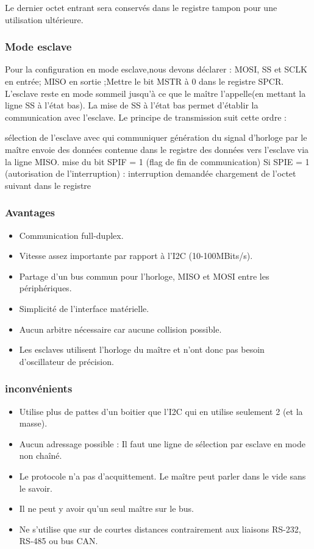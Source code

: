 \documentclass[french,a4paper,12pt]{report}
\begin{document}
Le dernier octet entrant sera conservés dans le registre tampon pour une utilisation ultérieure.

  \subsubsection{Mode esclave}
Pour la configuration en mode esclave,nous devons déclarer : MOSI, SS et SCLK en entrée; MISO en sortie ;Mettre le bit MSTR à 0 dans le registre SPCR. L’esclave reste en mode sommeil jusqu’à ce que le maître l'appelle(en mettant la ligne SS à l’état bas). La mise de SS à l’état bas permet d'établir la communication avec l’esclave. Le principe de transmission suit cette ordre :

    sélection de l'esclave avec qui communiquer
    génération du signal d'horloge par le maître
    envoie des données contenue dans le registre des données vers l’esclave via la ligne MISO.
    mise du bit SPIF = 1 (flag de fin de communication)
    Si SPIE = 1 (autorisation de l’interruption) :
        interruption demandée
        chargement de l’octet suivant dans le registre
        
  \subsubsection{Avantages}

\begin{itemize}
\item Communication full-duplex.
\item Vitesse assez importante par rapport à l’I2C (10-100MBits/s).
\item Partage d’un bus commun pour l’horloge, MISO et MOSI entre les périphériques.
\item Simplicité de l’interface matérielle.
\item Aucun arbitre nécessaire car aucune collision possible.
\item Les esclaves utilisent l’horloge du maître et n’ont donc pas besoin d’oscillateur de précision.
\end{itemize}

  \subsubsection{inconvénients}

\begin{itemize}
\item Utilise plus de pattes d’un boitier que l’I2C qui en utilise seulement 2 (et la masse).
\item Aucun adressage possible : Il faut une ligne de sélection par esclave en mode non chaîné.
\item Le protocole n’a pas d’acquittement. Le maître peut parler dans le vide sans le savoir.
\item Il ne peut y avoir qu’un seul maître sur le bus.
\item Ne s’utilise que sur de courtes distances contrairement aux liaisons RS-232, RS-485 ou bus CAN.
\end{itemize}
\end{document}
